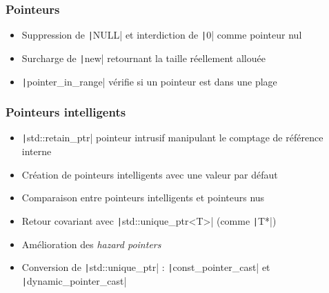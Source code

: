 \documentclass[C++.tex]{subfiles}
\begin{document}
\begin{frame}[fragile]
	\frametitle{Pointeurs}
	\begin{itemize}
		\item Suppression de \texttt|NULL| et interdiction de \texttt|0| comme pointeur nul
		\item Surcharge de \texttt|new| retournant la taille réellement allouée
		\item \texttt|pointer_in_range| vérifie si un pointeur est dans une plage
	\end{itemize}

\end{frame}

\begin{frame}[fragile]
	\frametitle{Pointeurs intelligents}
	\begin{itemize}
		\item \texttt|std::retain_ptr| pointeur intrusif manipulant le comptage de référence interne
		\item Création de pointeurs intelligents avec une valeur par défaut
		\item Comparaison entre pointeurs intelligents et pointeurs nus
		\item Retour covariant avec \texttt|std::unique_ptr<T>| (comme \texttt|T*|)
		\item Amélioration des \textit{hazard pointers}
		\item Conversion de \texttt|std::unique_ptr| : \texttt|const_pointer_cast| et \texttt|dynamic_pointer_cast|
	\end{itemize}

\end{frame}
\end{document}
